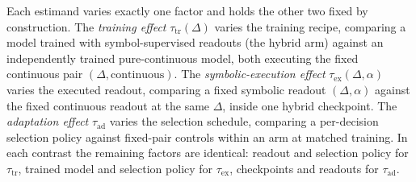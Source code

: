 Each estimand varies exactly one factor and holds the other two fixed by construction. The \emph{training effect} $\tau_{\mathrm{tr}}(\Delta)$ varies the training recipe, comparing a model trained with symbol-supervised readouts (the hybrid arm) against an independently trained pure-continuous model, both executing the fixed continuous pair $(\Delta, \mathrm{continuous})$. The \emph{symbolic-execution effect} $\tau_{\mathrm{ex}}(\Delta, \alpha)$ varies the executed readout, comparing a fixed symbolic readout $(\Delta, \alpha)$ against the fixed continuous readout at the same $\Delta$, inside one hybrid checkpoint. The \emph{adaptation effect} $\tau_{\mathrm{ad}}$ varies the selection schedule, comparing a per-decision selection policy against fixed-pair controls within an arm at matched training. In each contrast the remaining factors are identical: readout and selection policy for $\tau_{\mathrm{tr}}$, trained model and selection policy for $\tau_{\mathrm{ex}}$, checkpoints and readouts for $\tau_{\mathrm{ad}}$.

